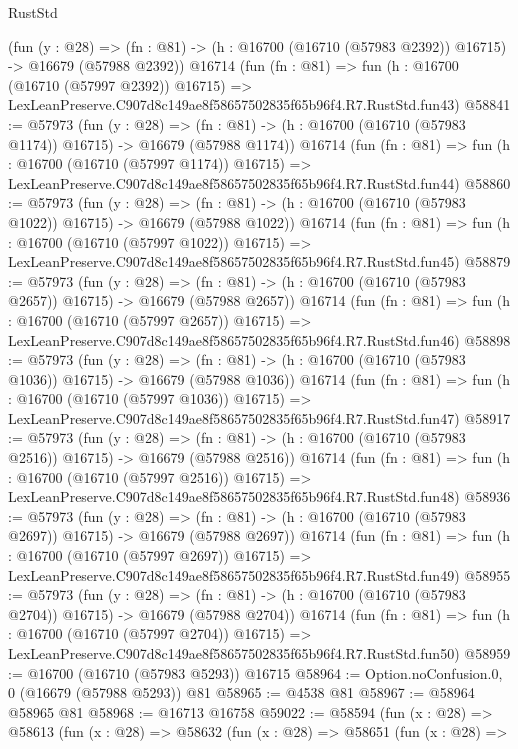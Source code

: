 \begin{lexlean}{RustStd}
\begin{coremodule}
    (fun (y : @28) =>
    (fn : @81) -> (h : @16700 (@16710 (@57983 @2392)) @16715) -> @16679 (@57988 @2392))
    @16714
    (fun (fn : @81) =>
    fun (h : @16700 (@16710 (@57997 @2392)) @16715) =>
    LexLeanPreserve.C907d8c149ae8f58657502835f65b96f4.R7.RustStd.fun43)
@58841 := @57973
    (fun (y : @28) =>
    (fn : @81) -> (h : @16700 (@16710 (@57983 @1174)) @16715) -> @16679 (@57988 @1174))
    @16714
    (fun (fn : @81) =>
    fun (h : @16700 (@16710 (@57997 @1174)) @16715) =>
    LexLeanPreserve.C907d8c149ae8f58657502835f65b96f4.R7.RustStd.fun44)
@58860 := @57973
    (fun (y : @28) =>
    (fn : @81) -> (h : @16700 (@16710 (@57983 @1022)) @16715) -> @16679 (@57988 @1022))
    @16714
    (fun (fn : @81) =>
    fun (h : @16700 (@16710 (@57997 @1022)) @16715) =>
    LexLeanPreserve.C907d8c149ae8f58657502835f65b96f4.R7.RustStd.fun45)
@58879 := @57973
    (fun (y : @28) =>
    (fn : @81) -> (h : @16700 (@16710 (@57983 @2657)) @16715) -> @16679 (@57988 @2657))
    @16714
    (fun (fn : @81) =>
    fun (h : @16700 (@16710 (@57997 @2657)) @16715) =>
    LexLeanPreserve.C907d8c149ae8f58657502835f65b96f4.R7.RustStd.fun46)
@58898 := @57973
    (fun (y : @28) =>
    (fn : @81) -> (h : @16700 (@16710 (@57983 @1036)) @16715) -> @16679 (@57988 @1036))
    @16714
    (fun (fn : @81) =>
    fun (h : @16700 (@16710 (@57997 @1036)) @16715) =>
    LexLeanPreserve.C907d8c149ae8f58657502835f65b96f4.R7.RustStd.fun47)
@58917 := @57973
    (fun (y : @28) =>
    (fn : @81) -> (h : @16700 (@16710 (@57983 @2516)) @16715) -> @16679 (@57988 @2516))
    @16714
    (fun (fn : @81) =>
    fun (h : @16700 (@16710 (@57997 @2516)) @16715) =>
    LexLeanPreserve.C907d8c149ae8f58657502835f65b96f4.R7.RustStd.fun48)
@58936 := @57973
    (fun (y : @28) =>
    (fn : @81) -> (h : @16700 (@16710 (@57983 @2697)) @16715) -> @16679 (@57988 @2697))
    @16714
    (fun (fn : @81) =>
    fun (h : @16700 (@16710 (@57997 @2697)) @16715) =>
    LexLeanPreserve.C907d8c149ae8f58657502835f65b96f4.R7.RustStd.fun49)
@58955 := @57973
    (fun (y : @28) =>
    (fn : @81) -> (h : @16700 (@16710 (@57983 @2704)) @16715) -> @16679 (@57988 @2704))
    @16714
    (fun (fn : @81) =>
    fun (h : @16700 (@16710 (@57997 @2704)) @16715) =>
    LexLeanPreserve.C907d8c149ae8f58657502835f65b96f4.R7.RustStd.fun50)
@58959 := @16700 (@16710 (@57983 @5293)) @16715
@58964 := Option.noConfusion.{0, 0} (@16679 (@57988 @5293)) @81
@58965 := @4538 @81
@58967 := @58964 @58965 @81
@58968 := @16713 @16758
@59022 := @58594
    (fun (x : @28) =>
    @58613
      (fun (x : @28) =>
      @58632
        (fun (x : @28) =>
        @58651
          (fun (x : @28) =>

\end{coremodule}
\end{lexlean}
